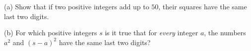(a) Show that if two positive integers add up to $50$, their squares have the same last two digits.

(b) For which positive integers $s$ is it true that for \emph{every} integer $a$, the numbers $a^2$ and $(s-a)^2$ have the same last two digits?
